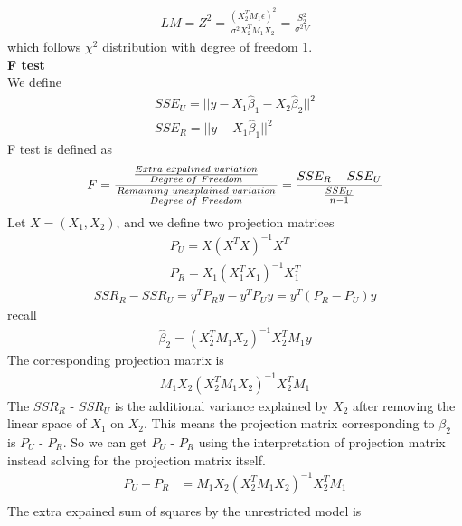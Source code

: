 \documentclass[a4paper]{article}
\begin{document}
\begin{align*}
LM =  Z^2  = \frac{(X_2^TM_1\epsilon)^2}{\sigma^2X_2^TM_1X_2} = \frac{S_2^2}{\sigma^2 V}
\end{align*}
which follows $\chi^2$ distribution with degree of freedom 1.\\
{\bf F test}\\
We define
\begin{align*}
SSE_U = ||y -X_1\hat\beta_1 - X_2\hat\beta_2||^2\\
SSE_R = ||y -X_1\hat\beta_1 ||^2
\end{align*}
F test is defined as
\begin{align*}
F = \frac{\frac{Extra \hspace{1mm} expalined \hspace{1mm} variation}{Degree \hspace{1mm} of \hspace{1mm} Freedom}}{\frac{Remaining \hspace{1mm}  unexplained \hspace{1mm} variation}{Degree \hspace{1mm} of \hspace{1mm} Freedom}} = \frac{SSE_R - SSE_U}{\frac{SSE_U}{n-1}}
\end{align*}
Let $X=(X_1, X_2)$, and we define two projection matrices
\begin{align*}
P_U = X(X^TX)^{-1}X^T\\
P_R = X_1(X_1^TX_1)^{-1}X_1^T
\end{align*}
\begin{align*}
SSR_R-SSR_U=y^TP_Ry-y^TP_Uy = y^T(P_R-P_U)y
\end{align*}
recall
\begin{align*}
\hat \beta_2 = (X_2^T M_1 X_2)^{-1}X_2^TM_1 y
\end{align*}
The corresponding projection matrix is
\begin{align*}
M_1X_2 (X_2^T M_1 X_2)^{-1}X_2^TM_1
\end{align*}
The $SSR_R$ - $SSR_U$ is the additional variance explained by $X_2$ after removing the linear space of $X_1$ on $X_2$.  This means the projection matrix corresponding to $\beta_2$ is $P_U$ - $P_R$. So we can get $P_U$ - $P_R$ using the interpretation of projection matrix instead solving for the projection matrix itself.
\begin{align*}
P_U-P_R & =M_1X_2(X_2^TM_1X_2)^{-1}X_2^TM_1\\
\end{align*}
The extra expained sum of squares by the unrestricted model is
\end{document}
